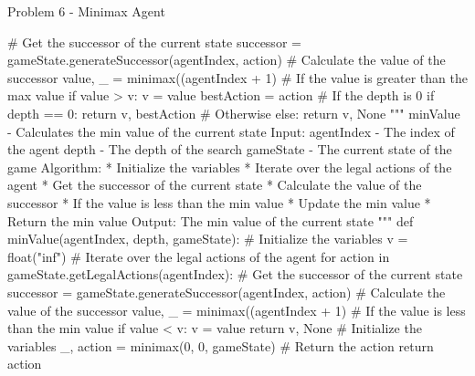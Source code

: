 \begin{problem}{Problem 6 - Minimax Agent}
\begin{highlight}[Solution]
\begin{code}[Python]
                # Get the successor of the current state
                successor = gameState.generateSuccessor(agentIndex, action)
                # Calculate the value of the successor
                value, _ = minimax((agentIndex + 1) %
                # If the value is greater than the max value
                if value > v:
                    v = value
                    bestAction = action
            # If the depth is 0
            if depth == 0:
                return v, bestAction
            # Otherwise
            else:
                return v, None
        """ minValue - Calculates the min value of the current state
                Input:
                agentIndex - The index of the agent
                depth - The depth of the search
                gameState - The current state of the game
                Algorithm:
                * Initialize the variables
                * Iterate over the legal actions of the agent
                    * Get the successor of the current state
                    * Calculate the value of the successor
                    * If the value is less than the min value
                    * Update the min value
                * Return the min value
                Output:
                The min value of the current state
        """
        def minValue(agentIndex, depth, gameState):
            # Initialize the variables
            v = float("inf")
            # Iterate over the legal actions of the agent
            for action in gameState.getLegalActions(agentIndex):
                # Get the successor of the current state
                successor = gameState.generateSuccessor(agentIndex, action)
                # Calculate the value of the successor
                value, _ = minimax((agentIndex + 1) %
                # If the value is less than the min value
                if value < v:
                    v = value
            return v, None
        # Initialize the variables
        _, action = minimax(0, 0, gameState)
        # Return the action
        return action
    \end{code}
    \end{highlight}
\end{problem}

